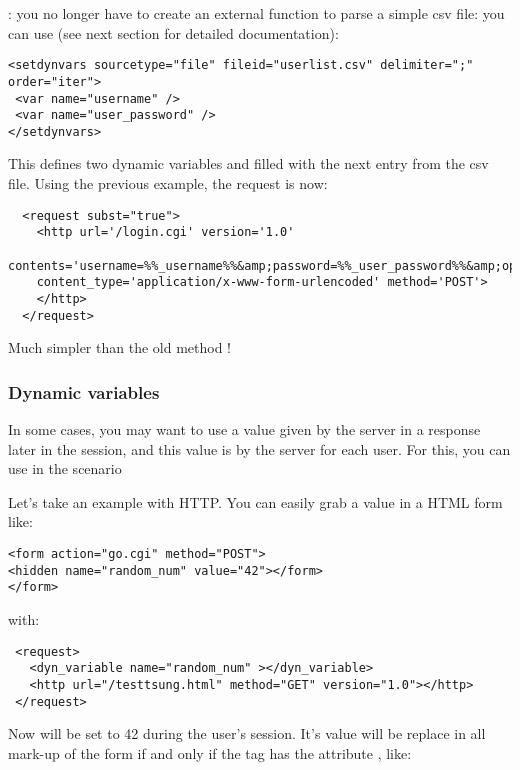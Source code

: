 \documentclass{TSUNG-en}
\begin{document}
: you no longer have to create an external
function to parse a simple csv file: you can use 
(see next section for detailed documentation):

\begin{Verbatim}
<setdynvars sourcetype="file" fileid="userlist.csv" delimiter=";" order="iter">
 <var name="username" />
 <var name="user_password" />
</setdynvars>
\end{Verbatim}

This defines two dynamic variables  and
 filled with the next entry from the csv
file. Using the previous example, the request is now:
\begin{Verbatim}
  <request subst="true">
    <http url='/login.cgi' version='1.0'
      contents='username=%%_username%%&amp;password=%%_user_password%%&amp;op=login'
    content_type='application/x-www-form-urlencoded' method='POST'>
    </http>
  </request>
\end{Verbatim}

Much simpler than the old method !

\subsubsection{Dynamic variables}

In some cases, you may want to use a value given by the server in a
response later in the session, and this value is  by the server for each user. For this, you can use
 in the scenario

Let's take an example with HTTP. You can easily grab a value in a HTML
form like:
\begin{Verbatim}
<form action="go.cgi" method="POST">
<hidden name="random_num" value="42"></form>
</form>
\end{Verbatim}

with:
\begin{Verbatim}
 <request>
   <dyn_variable name="random_num" ></dyn_variable>
   <http url="/testtsung.html" method="GET" version="1.0"></http>
 </request>
\end{Verbatim}

Now  will be set to 42 during the user's session. It's
value will be replace in all mark-up of the form
 if and only if the  tag has the
attribute , like:
\end{document}
